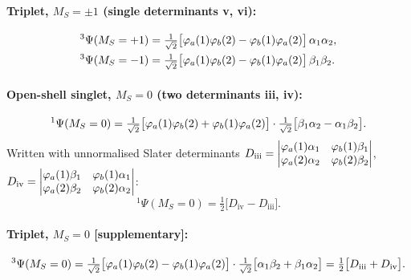 \paragraph{Triplet, $M_S=\pm1$ (single determinants v, vi):}
\begin{align}
  {}^3\Psi(M_S=+1) &= \tfrac{1}{\sqrt2}\bigl[\varphi_a(1)\varphi_b(2)-\varphi_b(1)\varphi_a(2)\bigr]\,\alpha_1\alpha_2,\\
  {}^3\Psi(M_S=-1) &= \tfrac{1}{\sqrt2}\bigl[\varphi_a(1)\varphi_b(2)-\varphi_b(1)\varphi_a(2)\bigr]\,\beta_1\beta_2.
\end{align}

\paragraph{Open-shell singlet, $M_S=0$ (two determinants iii, iv):}
\begin{equation}
  {}^1\Psi(M_S=0) = \tfrac{1}{\sqrt2}\bigl[\varphi_a(1)\varphi_b(2)+\varphi_b(1)\varphi_a(2)\bigr]\cdot
                    \tfrac{1}{\sqrt2}\bigl[\beta_1\alpha_2-\alpha_1\beta_2\bigr].
\end{equation}
Written with unnormalised Slater determinants
$D_{\text{iii}}=\begin{vmatrix}\varphi_a(1)\alpha_1 & \varphi_b(1)\beta_1\\ \varphi_a(2)\alpha_2 & \varphi_b(2)\beta_2\end{vmatrix}$,
$D_{\text{iv}}=\begin{vmatrix}\varphi_a(1)\beta_1 & \varphi_b(1)\alpha_1\\ \varphi_a(2)\beta_2 & \varphi_b(2)\alpha_2\end{vmatrix}$:
\begin{equation}
  {}^1\Psi(M_S=0) = \tfrac{1}{2}\bigl[D_{\text{iv}} - D_{\text{iii}}\bigr].
\end{equation}

\paragraph{Triplet, $M_S=0$ [supplementary]:}
\begin{equation}
  {}^3\Psi(M_S=0) = \tfrac{1}{\sqrt2}\bigl[\varphi_a(1)\varphi_b(2)-\varphi_b(1)\varphi_a(2)\bigr]\cdot
  \tfrac{1}{\sqrt2}\bigl[\alpha_1\beta_2+\beta_1\alpha_2\bigr] = \tfrac12\bigl[D_{\text{iii}}+D_{\text{iv}}\bigr].
\end{equation}

